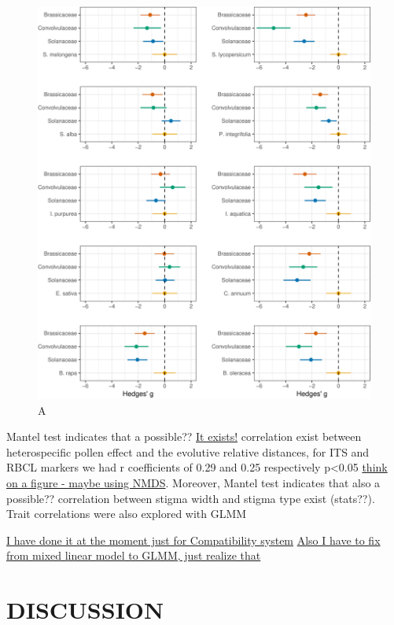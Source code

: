 \documentclass[11pt,a4paper]{article}
\begin{document}
\begin{figure}
\centering
\includegraphics{output/figures/unnamed-chunk-6-1.pdf}
\caption{A}
\end{figure}

\newpage

Mantel test indicates that a possible?? \href{}{It exists!} correlation
exist between heterospecific pollen effect and the evolutive relative
distances, for ITS and RBCL markers we had r coefficients of 0.29 and
0.25 respectively p\textless{}0.05 \href{}{think on a figure - maybe
using NMDS}. Moreover, Mantel test indicates that also a possible??
correlation between stigma width and stigma type exist (stats??). Trait
correlations were also explored with GLMM

\href{Jose}{I have done it at the moment just for Compatibility system}
\href{Jose}{Also I have to fix from mixed linear model to GLMM, just
realize that}

\newpage

\section{DISCUSSION}\label{discussion}
\end{document}
